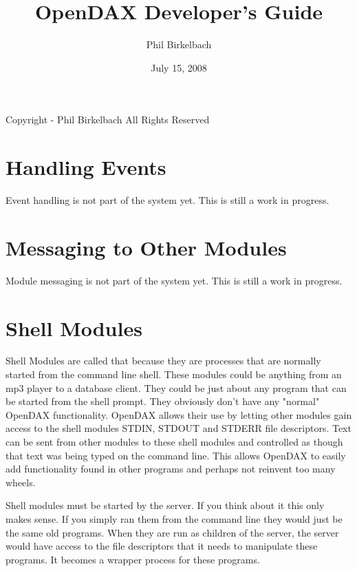 

\title{OpenDAX Developer's Guide}
\date{July 15, 2008}
\author{Phil Birkelbach}


\maketitle
\begin{flushleft}
Copyright  - Phil Birkelbach\linebreak
All Rights Reserved

\end{flushleft}

\tableofcontents
\newpage
{}







\chapter{Handling Events}

Event handling is not part of the system yet.  This is still a work in progress.

\chapter{Messaging to Other Modules}

Module messaging is not part of the system yet.  This is still a work in progress.

\chapter{Shell Modules}
Shell Modules are called that because they are processes that are normally started from the command line shell.  These modules could be anything from an mp3 player to a database client.  They could be just about any program that can be started from the shell prompt.  They obviously don't have any "normal" OpenDAX functionality.  OpenDAX allows their use by letting other modules gain access to the shell modules STDIN, STDOUT and STDERR file descriptors.  Text can be sent from other modules to these shell modules and controlled as though that text was being typed on the command line.  This allows OpenDAX to easily add functionality found in other programs and perhaps not reinvent too many wheels.

Shell modules must be started by the \opendax server.  If you think about it this only makes sense.  If you simply ran them from the command line they would just be the same old programs.  When they are run as children of the \opendax server, the server would have access to the file descriptors that it needs to manipulate these programs.  It becomes a wrapper process for these programs.

